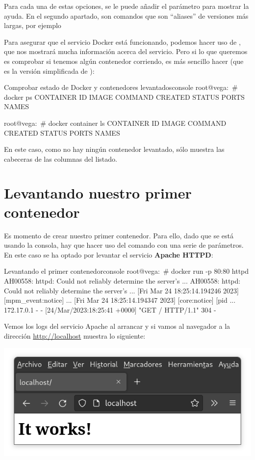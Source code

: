 Para cada una de estas opciones, se le puede añadir el parámetro  para mostrar la ayuda. En el segundo apartado, son comandos que son “aliases” de versiones más largas, por ejemplo

Para asegurar que el servicio Docker está funcionando, podemos hacer uso de , que nos mostrará mucha información acerca del servicio. Pero si lo que queremos es comprobar si tenemos algún contenedor corriendo, es más sencillo hacer  (que es la versión simplificada de  ):

\begin{mycode}{Comprobar estado de Docker y contenedores levantados}{console}{}
root@vega:~# docker ps
CONTAINER ID   IMAGE     COMMAND   CREATED   STATUS    PORTS     NAMES

root@vega:~# docker container ls
CONTAINER ID   IMAGE     COMMAND   CREATED   STATUS    PORTS     NAMES
\end{mycode}

En este caso, como no hay ningún contenedor levantado, sólo muestra las cabeceras de las columnas del listado.

\section{Levantando nuestro primer contenedor}
Es momento de crear nuestro primer contenedor. Para ello, dado que se está usando la consola, hay que hacer uso del comando  con una serie de parámetros. En este caso se ha optado por levantar el servicio \textbf{Apache HTTPD}:

\begin{mycode}{Levantando el primer contenedor}{console}{}
root@vega:~# docker run -p 80:80 httpd
AH00558: httpd: Could not reliably determine the server's ...
AH00558: httpd: Could not reliably determine the server's ...
[Fri Mar 24 18:25:14.194246 2023] [mpm_event:notice] ...
[Fri Mar 24 18:25:14.194347 2023] [core:notice] [pid  ...
172.17.0.1 - - [24/Mar/2023:18:25:41 +0000] "GET / HTTP/1.1" 304 -
\end{mycode}

Vemos los logs del servicio Apache al arrancar y si vamos al navegador a la dirección \href{http://localhost}{http://localhost} muestra lo siguiente:

\begin{center}
    \includegraphics[width=0.6\linewidth]{img/docker/apache.png}
\end{center}

